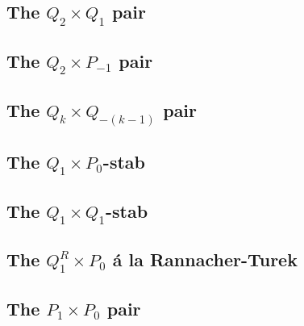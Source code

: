 \subsection{The $Q_2 \times Q_1$ pair} \label{ss:pairq2q1}


\subsection{The $Q_2 \times P_{-1}$ pair} \label{ss:pairq2pm1}


\subsection{The $Q_k \times Q_{-(k-1)}$ pair} \label{ss:pair_q2qm1}


\subsection{The $Q_1\times P_0$-stab} \label{ss:pairq1p0stab}


\subsection{The $Q_1\times Q_1$-stab}


\subsection{The ${ Q}_1^R\times P_0$ {\'a} la Rannacher-Turek \label{ss:RTq1p0}}


\subsection{The ${ P}_1\times P_0$ pair} \label{ss:p1p0}


